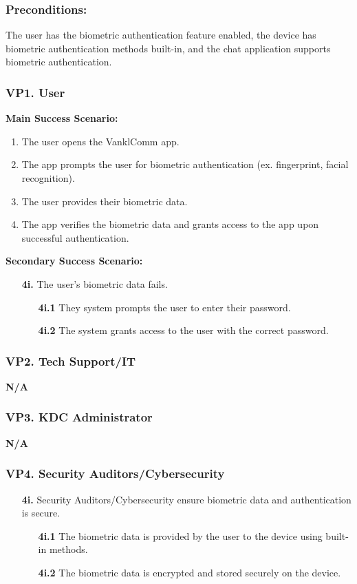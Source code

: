 \documentclass[]{article}
\begin{document}
\subsubsection*{Preconditions:} The user has the biometric authentication feature enabled, the device has biometric authentication methods built-in, and the chat application supports biometric authentication.
\subsubsection*{VP1. User}
\textbf{Main Success Scenario:}
\begin{enumerate}
	\item The user opens the VanklComm app.
	\item The app prompts the user for biometric authentication (ex. fingerprint, facial recognition).
	\item The user provides their biometric data.
	\item The app verifies the biometric data and grants access to the app upon successful authentication.
\end{enumerate}
\textbf{Secondary Success Scenario:}
\begin{enumerate}
	\item[\textbf{4i.}] The user's biometric data fails.
		\begin{enumerate}
			\item[\textbf{4i.1}] They system prompts the user to enter their password.
			\item[\textbf{4i.2}] The system grants access to the user with the correct password.
		\end{enumerate}
\end{enumerate}
\subsubsection*{VP2. Tech Support/IT}
\textbf{N/A}
\subsubsection*{VP3. KDC Administrator}
\textbf{N/A}
\subsubsection*{VP4. Security Auditors/Cybersecurity}
\begin{enumerate}
	\item[\textbf{4i.}] Security Auditors/Cybersecurity ensure biometric data and authentication is secure.
		\begin{enumerate}
			\item[\textbf{4i.1}] The biometric data is provided by the user to the device using built-in methods.
			\item[\textbf{4i.2}] The biometric data is encrypted and stored securely on the device.
		\end{enumerate}
\end{enumerate}
\end{document}
